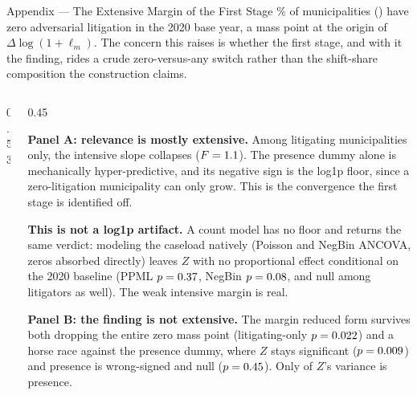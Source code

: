 
\begin{frame}{Appendix --- The Extensive Margin of the First Stage}
\hypertarget{app:extensive}{}
\footnotesize
\noindent \ExtMassPointPct\% of municipalities (\ExtMassPointN{}) have zero adversarial litigation in the 2020 base year, a mass point at the origin of $\Delta\log(1+\ell_m)$. The concern this raises is whether the first stage, and with it the finding, rides a crude zero-versus-any switch rather than the shift-share composition the construction claims.
\smallskip
\begin{columns}[T]
\begin{column}{0.53\linewidth}
\centering
\resizebox{\linewidth}{!}{}
\end{column}
\begin{column}{0.45\linewidth}
{\scriptsize
\textbf{Panel A: relevance is mostly extensive.} Among litigating municipalities only, the intensive slope collapses ($F=1.1$). The presence dummy alone is mechanically hyper-predictive, and its negative sign is the log1p floor, since a zero-litigation municipality can only grow. This is the convergence the first stage is identified off.\par
\textbf{This is not a log1p artifact.} A count model has no floor and returns the same verdict: modeling the caseload natively (Poisson  and NegBin ANCOVA, zeros absorbed directly) leaves $Z$ with no proportional effect conditional on the 2020 baseline (PPML $p=0.37$, NegBin $p=0.08$, and null among litigators as well). The weak intensive margin is real.\par
\textbf{Panel B: the finding is not extensive.} The margin reduced form survives both dropping the entire zero mass point (litigating-only $p=0.022$) and a horse race against the presence dummy, where $Z$ stays significant ($p=0.009$) and presence is wrong-signed and null ($p=0.45$). Only \ExtZonDzeroRtwo{} of $Z$'s variance is presence.\par}

\end{column}
\end{columns}
\end{frame}
